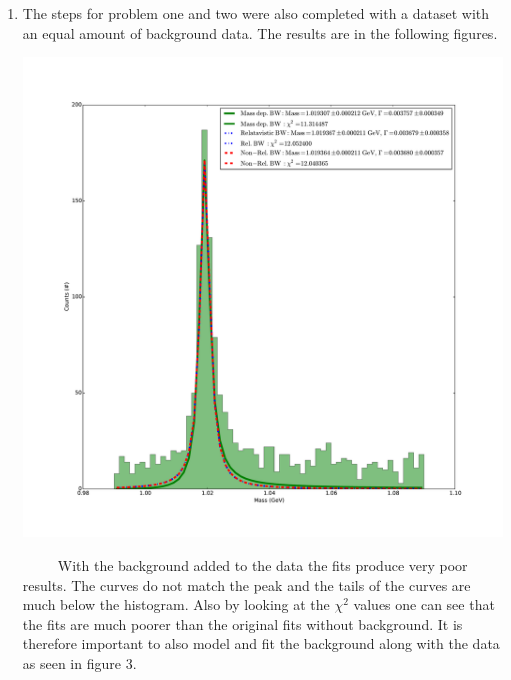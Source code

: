 \documentclass[pdftex]{article}
\begin{document}
\begin{enumerate}
	\item The steps for problem one and two were also completed with a dataset with an equal amount of background data.
		The results are in the following figures.

		\includegraphics[scale=0.35]{Problem_3_nobackfit.pdf}


		\ \ \ \ \ With the background added to the data the fits produce very poor results. The curves do not match the peak
		and the tails of the curves are much below the histogram. Also by looking at the $\chi^2$ values one can
		see that the fits are much poorer than the original fits without background. It is therefore important 
		to also model and fit the background along with the data as seen in figure 3.


\end{enumerate}
\end{document}
